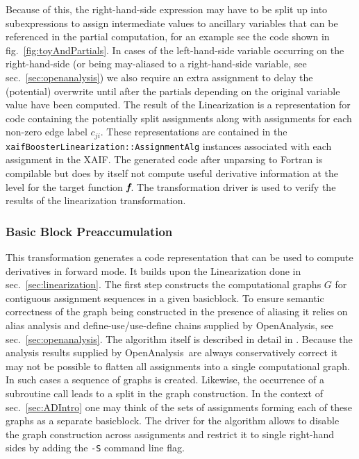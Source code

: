\documentclass{book}
\newcommand{\basicblock}{basicblock}
\newcommand{\OpenAnalysis}{OpenAnalysis}
\newcommand{\xaif}{XAIF}
\newcommand{\bmf}{\mbox{\bf\em f}}
\newcommand{\refsec}[1]{{sec.~\ref{#1}}}
\newcommand{\reffig}[1]{{fig.~\ref{#1}}}
\begin{document}
Because of this, 
the right-hand-side expression may have to be split up into 
subexpressions to assign intermediate values to ancillary variables 
that can be referenced in the partial computation, for an example see 
the code shown in \reffig{fig:toyAndPartials}.  
In cases of the left-hand-side variable occurring on the right-hand-side 
(or being may-aliased to a right-hand-side variable, 
see \refsec{sec:openanalysis}) we also require an extra assignment to 
delay the (potential) overwrite until after the partials depending on 
the original variable value have been computed.
The result of the Linearization is a representation for 
code containing the potentially split 
assignments along with assignments for each non-zero edge label $c_{ji}$.
These representations are contained in the \lstinline{xaifBoosterLinearization::AssignmentAlg} instances associated with each assignment in the \xaif.
The generated code after unparsing to Fortran 
is compilable but does by itself not compute useful 
derivative information at the level for the target function $\bmf$. The 
transformation driver is 
used to verify the results of the linearization transformation.

\subsubsection{Basic Block Preaccumulation}\label{sec:BBPreacc}

This transformation generates a code representation that can be used 
to compute derivatives in forward mode. It builds upon the Linearization
done in \refsec{sec:linearization}. 
The first step constructs the 
computational graphs $G$ 
for contiguous 
assignment sequences in a given \basicblock. To ensure semantic 
correctness of the graph being constructed in the presence of 
aliasing it relies on alias analysis and define-use/use-define chains 
supplied by \OpenAnalysis, see \refsec{sec:openanalysis}.
The algorithm itself is described in detail in \cite{Utke2005FBB}.
Because the analysis results supplied by \OpenAnalysis\ are always 
conservatively correct it may not be possible to flatten all 
assignments into a single computational graph. In such cases 
a sequence of graphs is created. Likewise, the occurrence 
of a subroutine call leads to a split in the graph construction. 
In the context of \refsec{sec:ADIntro} one may think of the sets of 
assignments forming each of these graphs as a separate \basicblock. 
The driver for the algorithm allows to disable 
the graph construction across assignments and restrict it to 
single right-hand sides by adding the \lstinline{-S} command 
line flag. 
\end{document}

